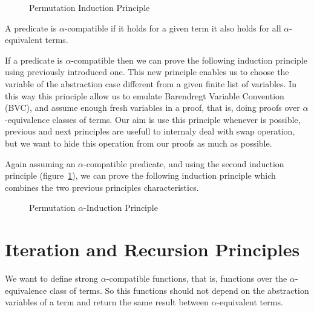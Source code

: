 \documentclass{article}
\newcommand{\alp}{\ensuremath{\alpha}}
\begin{document}
\begin{figure}[!ht]
  \caption{Permutation Induction Principle}
\label{fig:permInd}
\end{figure}

A predicate is \alp-compatible if it holds for a given term it also holds for all \alp-equivalent terms.

 \hspace{5px}

If a predicate is \alp-compatible then we can prove the following induction principle using previously introduced one. This new principle enables us to choose the variable of the abstraction case different from a given finite list of variables. In this way this principle allow us to emulate Barendregt Variable Convention (BVC), and assume enough fresh variables in a proof, that is, doing proofs over \alp-equivalence classes of terms. Our aim is use this principle whenever is possible, previous and next principles are usefull to internaly deal with swap operation, but we want to hide this operation from our proofs as much as possible.

 \hspace{5px}

Again assuming an \alp-compatible predicate, and using the second induction principle (figure~\ref{fig:permInd}), we can prove the following induction principle which combines the two previous principles characteristics.

\begin{figure}[!ht]
  \caption{Permutation \alp-Induction Principle}
\label{fig:permAlphaInd}
\end{figure}

\section{Iteration and Recursion Principles}
\label{sec:recursion}

We want to define strong \alp-compatible functions, that is, functions over the \alp-equivalence class of terms. So this functions should not depend on the abstraction variables of a term and return the same result between \alp-equivalent terms. 
\end{document}
